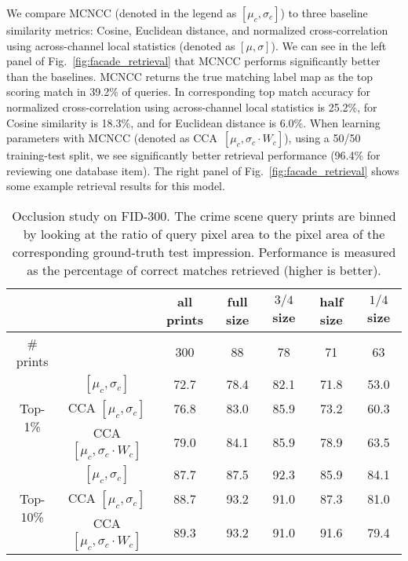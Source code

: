 \documentclass[twocolumn]{svjour3}           %
\begin{document}
We compare MCNCC (denoted in the legend as $[\mu_c,\sigma_c]$) to three
baseline similarity metrics: Cosine, Euclidean distance, and
normalized cross-correlation using across-channel local statistics (denoted as
$[\mu,\sigma]$).  We can see in the left panel of Fig.~\ref{fig:facade_retrieval}
that MCNCC performs significantly better than the baselines. MCNCC returns the
true matching label map as the top scoring match in 39.2\% of queries. In
corresponding top match accuracy for normalized cross-correlation using
across-channel local statistics is 25.2\%, for Cosine similarity is 18.3\%, and
for Euclidean distance is 6.0\%.  When learning parameters with MCNCC (denoted
as CCA~$[\mu_c,\sigma_c\cdot W_c]$), using a 50/50 training-test split, we
see significantly better retrieval performance (96.4\% for reviewing one
database item).  The right panel of Fig.~\ref{fig:facade_retrieval} shows some
example retrieval results for this model.

\begin{table*}[t]
\begin{center}
\begin{tabular}{c|c|c|c|c|c|c}
  & & all prints & full size & $3/4$ size & half size & $1/4$ size \\
  \hline
  \# prints & & 300 & 88 & 78 & 71 & 63 \\
  \hline
  \multirow{3}{*}{Top-1\%} & $[\mu_c,\sigma_c]$ & 72.7 & 78.4 & 82.1 & 71.8 & 53.0 \\
  & CCA $[\mu_c,\sigma_c]$ & 76.8 & 83.0 & 85.9 & 73.2 & 60.3 \\
  & CCA $[\mu_c,\sigma_c\cdot W_c]$ & 79.0 & 84.1 & 85.9 & 78.9 & 63.5 \\
  \hline
  \multirow{3}{*}{Top-10\%} & $[\mu_c,\sigma_c]$ & 87.7 & 87.5 & 92.3 & 85.9 & 84.1 \\
  & CCA $[\mu_c,\sigma_c]$ & 88.7 & 93.2 & 91.0 & 87.3 & 81.0 \\
  & CCA $[\mu_c,\sigma_c\cdot W_c]$ & 89.3 & 93.2 & 91.0 & 91.6 & 79.4
\end{tabular}
\end{center}
\caption{Occlusion study on FID-300. The crime scene query prints are binned by
looking at the ratio of query pixel area to the pixel area of the corresponding
ground-truth test impression. Performance is measured as the percentage of
correct matches retrieved (higher is better).}
\label{tab:basel_ablation}
\end{table*}
\end{document}
